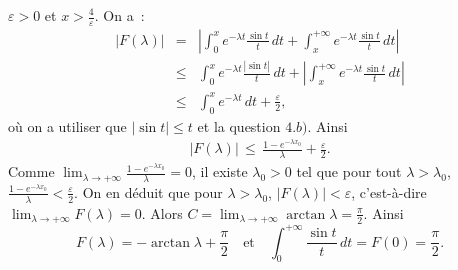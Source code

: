 {\begin{enumerate}
{$\varepsilon > 0$ et $x> \frac{4}{\varepsilon}$. On a~:
\begin{eqnarray*}
|F(\lambda)| & =  &\left| \int_{0}^{x} e^{-\lambda t} \frac{ \sin
t }{t}\, dt + \int_{x}^{+\infty} e^{-\lambda t} \frac{ \sin t
}{t}\, dt \right|\\
& \leq &  \int_{0}^{x} e^{-\lambda t} \frac{| \sin t| }{t}\, dt +
\left| \int_{x}^{+\infty} e^{-\lambda t} \frac{ \sin t
}{t}\, dt \right|\\
& \leq &  \int_{0}^{x} e^{-\lambda t} \,dt +
\frac{\varepsilon}{2},
\end{eqnarray*}
o\`u on a utiliser que $|\sin t| \leq t$ et la question $4. b)$.
Ainsi
\begin{eqnarray*}
|F(\lambda)| \,\leq \, \frac{1 - e^{-\lambda x_{0}}}{\lambda} +
\frac{\varepsilon}{2}.
\end{eqnarray*}
Comme $\lim_{\lambda \rightarrow +\infty}\frac{1 - e^{-\lambda
x_{0}}}{\lambda} = 0$, il existe ${\lambda}_{0} > 0$ tel que pour
tout $\lambda > {\lambda}_{0}$, $\frac{1 - e^{-\lambda
x_{0}}}{\lambda} < \frac{\varepsilon}{2}$. On en d\'eduit que pour
$\lambda > {\lambda}_{0}$, $|F(\lambda)| < \varepsilon$,
c'est-\`a-dire $\lim_{\lambda \rightarrow +\infty}F(\lambda) = 0$.
Alors $C = \lim_{\lambda \rightarrow +\infty} \arctan \lambda =
\frac{\pi}{2}$. Ainsi
$$
F(\lambda) = -\arctan \lambda + \frac{\pi}{2} \quad \text{et}\quad
\int_{0}^{+\infty} \frac{\sin t}{t}\,dt = F(0) = \frac{\pi}{2}.
$$}
\end{enumerate}
}
